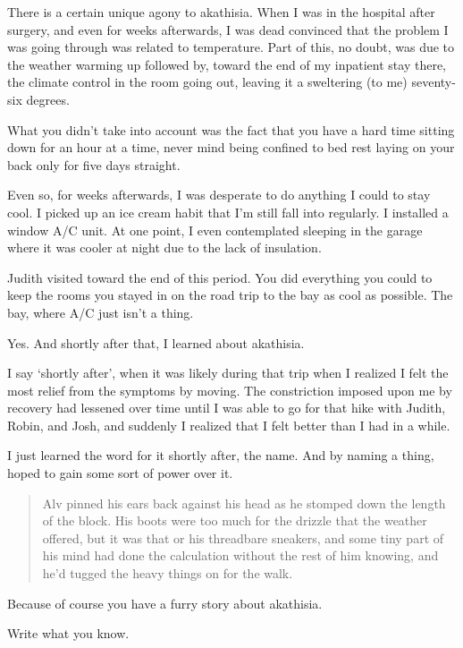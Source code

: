 \begin{paracol}{2}
\begin{leftcolumn}
\noindent There is a certain unique agony to akathisia. When I was in the hospital after surgery, and even for weeks afterwards, I was dead convinced that the problem I was going through was related to temperature. Part of this, no doubt, was due to the weather warming up followed by, toward the end of my inpatient stay there, the climate control in the room going out, leaving it a sweltering (to me) seventy-six degrees.

\begin{ally}
What you didn't take into account was the fact that you have a hard time sitting down for an hour at a time, never mind being confined to bed rest laying on your back only for five days straight.
\end{ally}
Even so, for weeks afterwards, I was desperate to do anything I could to stay cool. I picked up an ice cream habit that I'm still fall into regularly. I installed a window A/C unit. At one point, I even contemplated sleeping in the garage where it was cooler at night due to the lack of insulation.

\begin{ally}
Judith visited toward the end of this period. You did everything you could to keep the rooms you stayed in on the road trip to the bay as cool as possible. The bay, where A/C just isn't a thing.
\end{ally}
Yes. And shortly after that, I learned about akathisia.

I say `shortly after', when it was likely during that trip when I realized I felt the most relief from the symptoms by moving. The constriction imposed upon me by recovery had lessened over time until I was able to go for that hike with Judith, Robin, and Josh, and suddenly I realized that I felt better than I had in a while.

I just learned the word for it shortly after, the name. And by naming a thing, hoped to gain some sort of power over it.

\begin{quotation}
  \noindent Alv pinned his ears back against his head as he stomped down the length of the block. His boots were too much for the drizzle that the weather offered, but it was that or his threadbare sneakers, and some tiny part of his mind had done the calculation without the rest of him knowing, and he'd tugged the heavy things on for the walk.
\end{quotation}

\begin{ally}
Because of course you have a furry story about akathisia.
\end{ally}
Write what you know.


\end{leftcolumn}
\end{paracol}
